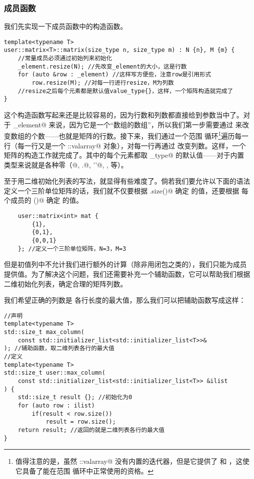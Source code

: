 \subsubsection*{成员函数}
我们先实现一下成员函数中的构造函数。
\begin{lstlisting}
template<typename T>
user::matrix<T>::matrix(size_type n, size_type m) : N {n}, M {m} {
    //常量成员必须通过初始列来初始化
    _element.resize(N); //先改变_element的大小，这是行数
    for (auto &row : _element) //这样写方便些，注意row是引用形式
        row.resize(M); //对每一行进行resize，M为列数
    //resize之后每个元素都是默认值value_type{}，这样，一个矩阵构造就完成了
}
\end{lstlisting}
这个构造函数写起来还是比较容易的，因为行数和列数都直接给到参数当中了。对于 \lstinline@_element@ 来说，因为它是一个``数组的数组''，所以我们第一步需要通过 \lstinline@resize@ 来改变数组的个数——也就是矩阵的行数。接下来，我们通过一个范围 \lstinline@for@ 循环\footnote{值得注意的是，虽然 \lstinline@std::valarray@ 没有内置的迭代器，但是它提供了 \lstinline@begin@ 和 \lstinline@end@，这使它具备了能在范围 \lstinline@for@ 循环中正常使用的资格。}遍历每一行（每一行又是一个 \lstinline@std::valarray@ 对象），对每一行再通过 \lstinline@resize@ 改变列数。这样，一个矩阵的构造工作就完成了。其中的每个元素都取 \lstinline@value_type@ 的默认值——对于内置类型来说就是各种零（@, .@, \lstinline@'\0'@, \lstinline@false@, \lstinline@nullptr@ 等）。\par
至于用二维初始化列表的写法，就显得有些难度了。倘若我们要允许以下面的语法定义一个三阶单位矩阵的话，我们就不仅要根据 \lstinline@ilist.size()@ 确定 \lstinline@N@ 的值，还要根据 \lstinline@ilist@ 每个成员的 \lstinline@size()@ 确定 \lstinline@M@ 的值。
\begin{lstlisting}
    user::matrix<int> mat {
        {1},
        {0,1},
        {0,0,1}
    }; //定义一个三阶单位矩阵，N=3，M=3
\end{lstlisting}
但是初值列中不允计我们进行额外的计算（除非用闭包之类的），我们只能为成员提供值。为了解决这个问题，我们还需要补充一个辅助函数，它可以帮助我们根据二维初始化列表，确定合理的矩阵列数。\par
我们希望正确的列数是 \lstinline@ilist@ 各行长度的最大值，那么我们可以把辅助函数写成这样：
\begin{lstlisting}
//声明
template<typename T>
std::size_t max_column(
    const std::initializer_list<std::initializer_list<T>>&
); //辅助函数，取二维列表各行的最大值
//定义
template<typename T>
std::size_t user::max_column(
    const std::initializer_list<std::initializer_list<T>> &ilist
) {
    std::size_t result {}; //初始化为0
    for (auto row : ilist)
        if(result < row.size())
            result = row.size();
    return result; //返回的就是二维列表各行的最大值
}
\end{lstlisting}

